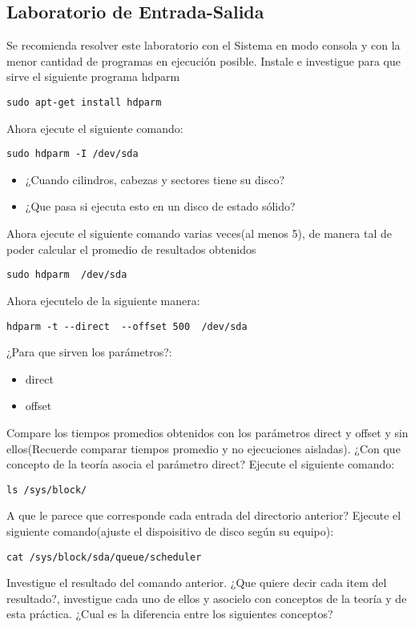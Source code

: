 \begin{questions}
\section{Laboratorio de Entrada-Salida}
Se recomienda resolver este laboratorio con el Sistema en modo consola y con la menor cantidad de programas en ejecución posible.
\question Instale e investigue para que sirve el siguiente programa hdparm
\begin{verbatim}
sudo apt-get install hdparm
\end{verbatim}
\question Ahora ejecute el siguiente comando:
\begin{verbatim}
sudo hdparm -I /dev/sda
\end{verbatim}
\begin{itemize}
  \item ¿Cuando cilindros, cabezas y sectores tiene su disco?
  \item ¿Que pasa si ejecuta esto en un disco de estado sólido?
\end{itemize}
\question Ahora ejecute el siguiente comando varias veces(al menos 5), de manera tal de poder calcular el promedio de resultados obtenidos
\begin{verbatim}
sudo hdparm  /dev/sda
\end{verbatim}
\question Ahora ejecutelo de la siguiente manera:
\begin{verbatim}
hdparm -t --direct  --offset 500  /dev/sda
\end{verbatim}
\question ¿Para que sirven los parámetros?:
\begin{itemize}
	\item direct
	\item offset
\end{itemize}
\question Compare los tiempos promedios obtenidos con los parámetros direct y offset y sin ellos(Recuerde comparar tiempos promedio y no ejecuciones aisladas).
\question ¿Con que concepto de la teoría asocia el parámetro direct?
\question Ejecute el siguiente comando:
\begin{verbatim}
ls /sys/block/
\end{verbatim}
\question A que le parece que corresponde cada entrada del directorio anterior?
\question Ejecute el siguiente comando(ajuste el dispoisitivo de disco según su equipo):
\begin{verbatim}
cat /sys/block/sda/queue/scheduler
\end{verbatim}
\question Investigue el resultado del comando anterior. ¿Que quiere decir cada item del resultado?, investigue cada uno de ellos y asocielo con conceptos de la teoría y de esta práctica. ¿Cual es la diferencia entre los siguientes conceptos? 

\end{questions}
